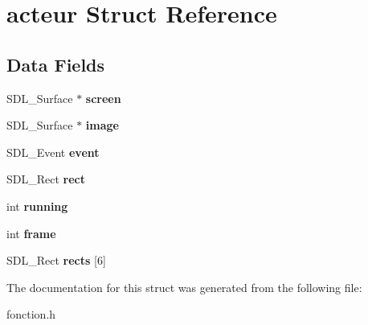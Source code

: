 \hypertarget{structacteur}{}\section{acteur Struct Reference}
\label{structacteur}
\subsection*{Data Fields}
\begin{DoxyCompactItemize}
\item 
\mbox{\label{structacteur_a07a96e94e6c43095e9fab0d1f077e3ac}} 
S\+D\+L\+\_\+\+Surface $\ast$ {\bfseries screen}
\item 
\mbox{\label{structacteur_ad45d4021795636e16e5785fbfa152530}} 
S\+D\+L\+\_\+\+Surface $\ast$ {\bfseries image}
\item 
\mbox{\label{structacteur_a5cbc6efc9f05581578b5adc9bcc3c15c}} 
S\+D\+L\+\_\+\+Event {\bfseries event}
\item 
\mbox{\label{structacteur_a6c0d04ec13207c162908f6337da3811a}} 
S\+D\+L\+\_\+\+Rect {\bfseries rect}
\item 
\mbox{\label{structacteur_a8143c336841efa3650723cbfa8e9e072}} 
int {\bfseries running}
\item 
\mbox{\label{structacteur_a87455e611fc9af834ea83a4a5ab199c4}} 
int {\bfseries frame}
\item 
\mbox{\label{structacteur_a150a7440132dce14893aafd9b07ea9eb}} 
S\+D\+L\+\_\+\+Rect {\bfseries rects} \mbox{[}6\mbox{]}
\end{DoxyCompactItemize}


The documentation for this struct was generated from the following file\+:\begin{DoxyCompactItemize}
\item 
fonction.\+h\end{DoxyCompactItemize}
